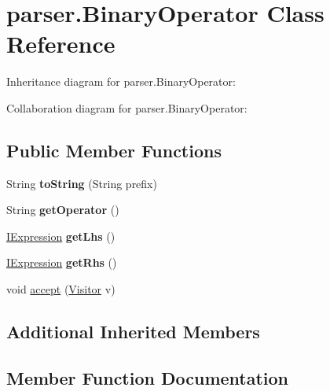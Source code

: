 \hypertarget{classparser_1_1_binary_operator}{}\section{parser.\+Binary\+Operator Class Reference}
\label{classparser_1_1_binary_operator}


Inheritance diagram for parser.\+Binary\+Operator\+:


Collaboration diagram for parser.\+Binary\+Operator\+:
\subsection*{Public Member Functions}
\begin{DoxyCompactItemize}
\item 
String {\bfseries to\+String} (String prefix)\hypertarget{classparser_1_1_binary_operator_aa4eaf1b6760f61f07148576fda87bdc8}{}\label{classparser_1_1_binary_operator_aa4eaf1b6760f61f07148576fda87bdc8}

\item 
String {\bfseries get\+Operator} ()\hypertarget{classparser_1_1_binary_operator_a595eea00929416075679db3f3549c66e}{}\label{classparser_1_1_binary_operator_a595eea00929416075679db3f3549c66e}

\item 
\hyperlink{interfaceparser_1_1_i_expression}{I\+Expression} {\bfseries get\+Lhs} ()\hypertarget{classparser_1_1_binary_operator_a049be34f32ac24afccff1d0031f397d9}{}\label{classparser_1_1_binary_operator_a049be34f32ac24afccff1d0031f397d9}

\item 
\hyperlink{interfaceparser_1_1_i_expression}{I\+Expression} {\bfseries get\+Rhs} ()\hypertarget{classparser_1_1_binary_operator_a79ca5f73cee44702c38d24cb5eedfd92}{}\label{classparser_1_1_binary_operator_a79ca5f73cee44702c38d24cb5eedfd92}

\item 
void \hyperlink{classparser_1_1_binary_operator_a5c729fde19d837e3e8c504cd7e28764b}{accept} (\hyperlink{interfacemain_1_1_visitor}{Visitor} v)
\end{DoxyCompactItemize}
\subsection*{Additional Inherited Members}


\subsection{Member Function Documentation}
